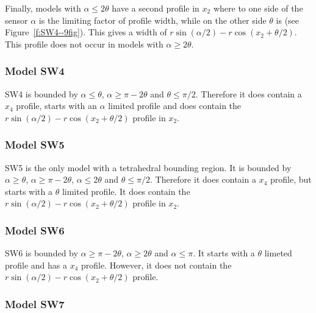 Finally, models with $\alpha \le 2\theta$ have a second profile in $x_2$ where to one side of the sensor $\alpha$ is the limiting factor of profile width, while on the other side $\theta$ is (see Figure~\ref{f:SW4--9fig}). This gives a width of $r\sin(\alpha/2) - r\cos(x_2 + \theta/2)$. This profile does not occur in models with $\alpha \ge 2\theta$.

\subsubsection{Model SW4} \label{SW4}

SW4 is bounded by $\alpha \le \theta$, $\alpha \ge \pi - 2\theta$ and $\theta \le \pi/2$. Therefore it does contain a $x_4$ profile, starts with an $\alpha$ limited profile and does contain the $r\sin(\alpha/2) - r\cos(x_2 + \theta/2)$ profile in $x_2$.



\subsubsection{Model SW5} \label{SW5}

SW5 is the only model with a tetrahedral bounding region. It is bounded by $\alpha \ge \theta$, $\alpha \ge \pi - 2\theta$, $\alpha \le 2\theta$ and $\theta \le \pi/2$. Therefore it does contain a $x_4$ profile, but starts with a $\theta$ limited profile. It does contain the $r\sin(\alpha/2) - r\cos(x_2 + \theta/2)$ profile in $x_2$.



\subsubsection{Model SW6} \label{SW6}

SW6 is bounded by $\alpha \ge \pi - 2\theta$,  $\alpha \ge 2\theta$ and $\alpha \le \pi$. It starts with a $\theta$ limeted profile and has a $x_4$ profile. However, it does not contain the $r\sin(\alpha/2) - r\cos(x_2 + \theta/2)$ profile.




\subsubsection{Model SW7} \label{SW7}

